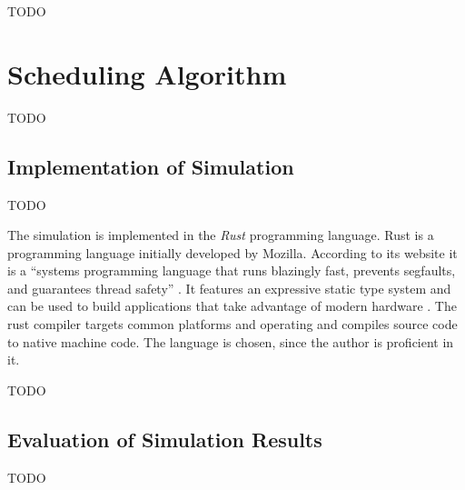 TODO

\section{Scheduling Algorithm}
TODO
\subsection{Implementation of Simulation}

TODO

The simulation is implemented in the \emph{Rust} programming language.
Rust is a programming language initially developed by Mozilla.
According to its website it is a \enquote{systems programming language that runs blazingly fast, prevents segfaults, and guarantees thread safety} \autocite{rust2018rust}.
It features an expressive static type system and can be used to build applications that take advantage of modern hardware
\autocite[][]{matsakis2014rust}.
The rust compiler targets common platforms and operating and compiles source code to native machine code.
The language is chosen, since the author is proficient in it.


TODO
\subsection{Evaluation of Simulation Results}
TODO

